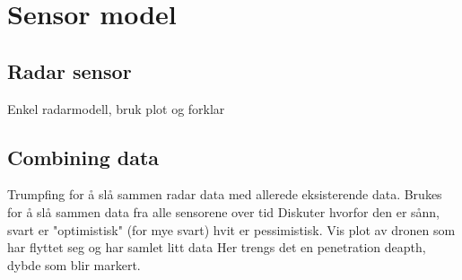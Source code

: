 \section{Sensor model}
\subsection{Radar sensor}
    Enkel radarmodell, bruk plot og forklar
\subsection{Combining data}
    Trumpfing for å slå sammen radar data med allerede eksisterende data. Brukes for å slå sammen data fra alle sensorene over tid
        Diskuter hvorfor den er sånn, svart er "optimistisk" (for mye svart) hvit er pessimistisk.
    Vis plot av dronen som har flyttet seg og har samlet litt data
    Her trengs det en penetration deapth, dybde som blir markert.
    
    